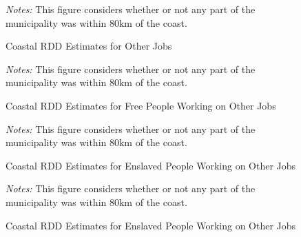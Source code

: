 \documentclass{article}
\begin{document}
\begin{figure}
  \caption{Coastal RDD Estimates for Other Jobs}
  \begin{center}
  \textit{Notes:} This figure considers whether or not any part of the municipality was within 80km of the coast.
  \end{center}
  \label{fig:1872_RDD_OtherJobs}
\end{figure}

\begin{figure}
  \caption{Coastal RDD Estimates for Free People Working on Other Jobs}
  \begin{center}
  \textit{Notes:} This figure considers whether or not any part of the municipality was within 80km of the coast.
  \end{center}
  \label{fig:1872_RDD_Free_OtherJobs}
\end{figure}

\begin{figure}
  \caption{Coastal RDD Estimates for Enslaved People Working on Other Jobs}
  \begin{center}
  \textit{Notes:} This figure considers whether or not any part of the municipality was within 80km of the coast.
  \end{center}
  \label{fig:1872_RDD_Enslaved_OtherJobs}
\end{figure}

\begin{figure}
  \caption{Coastal RDD Estimates for Enslaved People Working on Other Jobs}
  \begin{center}
  \textit{Notes:} This figure considers whether or not any part of the municipality was within 80km of the coast.
  \end{center}
  \label{fig:1872_RDD_Free_Jornaleiros}
\end{figure}
\end{document}
